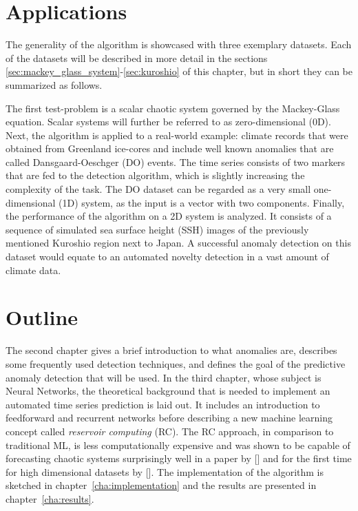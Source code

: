 \section{Applications}%
\label{sec:applications}

The generality of the algorithm is showcased with three exemplary datasets.
Each of the datasets will be described in more detail in the sections
\ref{sec:mackey_glass_system}-\ref{sec:kuroshio} of this chapter, but in short
they can be summarized as follows.

The first test-problem is a scalar chaotic system governed by the Mackey-Glass
equation. Scalar systems will further be referred to as zero-dimensional (0D).
%
Next, the algorithm is applied to a real-world example: climate records that
were obtained from Greenland ice-cores and include well known anomalies that
are called Dansgaard-Oeschger (DO) events.  The time series consists of two
markers that are fed to the detection algorithm, which is slightly increasing
the complexity of the task. The DO dataset can be regarded as a very small
one-dimensional (1D) system, as the input is a vector with two components.
%
Finally, the performance of the algorithm on a 2D system is analyzed. It
consists of a sequence of simulated sea surface height (SSH) images of the
previously mentioned Kuroshio region next to Japan. A successful anomaly
detection on this dataset would equate to an automated novelty detection in a
vast amount of climate data.



\section{Outline}%
\label{sec:outline}

The second chapter gives a brief introduction to what anomalies are, describes
some frequently used detection techniques, and defines the goal of the
predictive anomaly detection that will be used.  In the third chapter, whose
subject is Neural Networks, the theoretical background that is needed to
implement an automated time series prediction is laid out. It includes an
introduction to feedforward and recurrent networks before describing a new
machine learning concept called \emph{reservoir computing} (RC). The RC
approach, in comparison to traditional ML, is less computationally expensive
and was shown to be capable of forecasting chaotic systems surprisingly well in
a paper by [\cite{jaeger2004}] and for the first time for high dimensional
datasets by [\cite{pathak2018model}]. The implementation of the algorithm is
sketched in chapter~\ref{cha:implementation} and the results are presented in
chapter~\ref{cha:results}.


